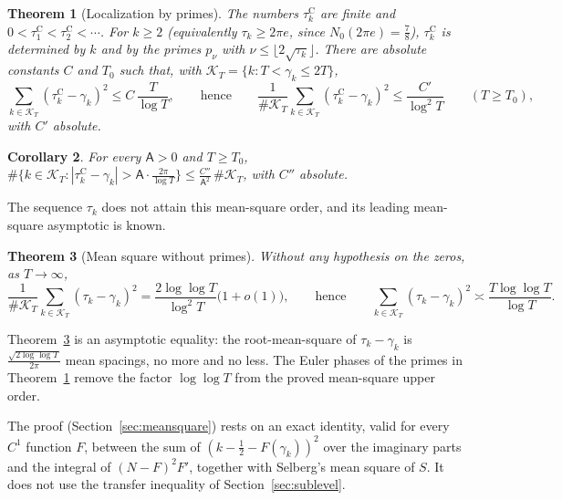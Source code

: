 \documentclass[11pt,a4paper]{article}
\makeatletter
\numberwithin{equation}{section}
\DeclareRobustCommand{\CGref}[1]{\ref{#1}}
\let\CG@origref\ref
\newcommand{\CG@gettip}[1]{\@ifundefined{CGTip@#1}{#1}{\csname CGTip@#1\endcsname}}
\DeclareRobustCommand{\CGref}[1]{\pdftooltip{\CG@origref{#1}}{\CG@gettip{#1}}}
\newtheorem{theorem}{Theorem}[section]
\newtheorem{corollary}[theorem]{Corollary}
\theoremstyle{definition}
\theoremstyle{remark}
\newcommand{\Nz}{N_0} %
\newcommand{\Kc}{\mathcal K}
\makeatother
\begin{document}
\begin{theorem}[Localization by primes]\label{thm:sublevel}
The numbers $\tau_{k}^{\mathrm C}$ are finite and $0<\tau_{1}^{\mathrm C}<\tau_{2}^{\mathrm C}<\cdots$. For $k\ge2$ (equivalently $\tau_k\ge2\pi e$, since $\Nz(2\pi e)=\frac78$), $\tau_{k}^{\mathrm C}$ is determined by $k$ and by the primes $p_\nu$ with $\nu\le\lfloor2\sqrt{\tau_k}\rfloor$. There are absolute constants $C$ and $T_0$ such that, with $\Kc_T=\{k:T<\gamma_k\le2T\}$,
\begin{equation}
\sum_{k\in\Kc_T}(\tau_{k}^{\mathrm C}-\gamma_k)^2\le C\,\frac T{\log T},\qquad\text{hence}\qquad \frac1{\#\Kc_T}\sum_{k\in\Kc_T}(\tau_{k}^{\mathrm C}-\gamma_k)^2\le\frac{C'}{\log^2T}\qquad(T\ge T_0),
\label{eq:main_sublevel}
\end{equation}
with $C'$ absolute.
\end{theorem}

\begin{corollary}\label{cor:proportion}
For every $\mathsf A>0$ and $T\ge T_0$, $\#\{k\in\Kc_T:|\tau_{k}^{\mathrm C}-\gamma_k|>\mathsf A\cdot\frac{2\pi}{\log T}\}\le\frac{C''}{\mathsf A^2}\,\#\Kc_T$, with $C''$ absolute.
\end{corollary}

The sequence $\tau_k$ does not attain this mean-square order, and its leading mean-square asymptotic is known.

\begin{theorem}[Mean square without primes]\label{thm:meansquare}
Without any hypothesis on the zeros, as $T\to\infty$,
\begin{equation}
\frac1{\#\Kc_T}\sum_{k\in\Kc_T}(\tau_k-\gamma_k)^2=\frac{2\log\log T}{\log^2T}\bigl(1+o(1)\bigr),\qquad\text{hence}\qquad \sum_{k\in\Kc_T}(\tau_k-\gamma_k)^2\asymp\frac{T\log\log T}{\log T}.
\label{eq:meansquare}
\end{equation}
\end{theorem}

Theorem~\CGref{thm:meansquare} is an asymptotic equality: the root-mean-square of $\tau_k-\gamma_k$ is $\frac{\sqrt{2\log\log T}}{2\pi}$ mean spacings, no more and no less. The Euler phases of the primes in Theorem~\CGref{thm:sublevel} remove the factor $\log\log T$ from the proved mean-square upper order. \par
The proof (Section~\CGref{sec:meansquare}) rests on an exact identity, valid for every $C^1$ function $F$, between the sum of $(k-\frac12-F(\gamma_k))^2$ over the imaginary parts and the integral of $(N-F)^2F'$, together with Selberg's mean square of $S$. It does not use the transfer inequality of Section~\CGref{sec:sublevel}.
\end{document}
